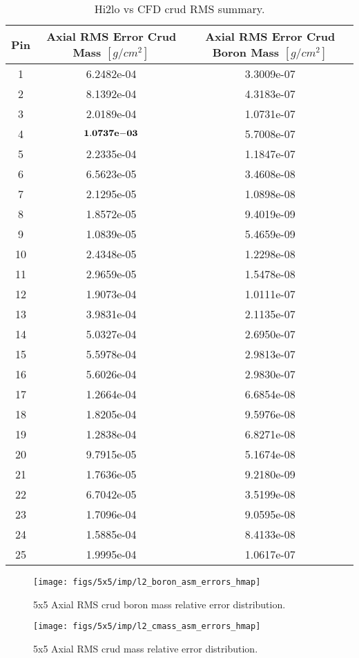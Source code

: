 \begin{table}[h]
    \begin{center}
        \caption[Hi2lo crud RMS summary.]{Hi2lo vs CFD crud RMS summary.}
    \begin{tabular}[h]{|c|C|C|}
        \hline
        Pin  & Axial RMS Error Crud Mass $[g/cm^2]$ & Axial RMS Error Crud Boron Mass $[g/cm^2]$ \\
\hline {}  & 6.2482e-04 &  3.3009e-07  \\
2  & 8.1392e-04 &  4.3183e-07  \\
3  & 2.0189e-04 &  1.0731e-07  \\
4  & $\mathbf{1.0737\mathrm{\bf e-}03}$ &  5.7008e-07  \\
5  & 2.2335e-04 &  1.1847e-07  \\
6  & 6.5623e-05 &  3.4608e-08  \\
7  & 2.1295e-05 &  1.0898e-08  \\
8  & 1.8572e-05 &  9.4019e-09  \\
9  & 1.0839e-05 &  5.4659e-09  \\
10 & 2.4348e-05 &  1.2298e-08  \\
11 & 2.9659e-05 &  1.5478e-08  \\
12 & 1.9073e-04 &  1.0111e-07  \\
13 & 3.9831e-04 &  2.1135e-07  \\
14 & 5.0327e-04 &  2.6950e-07  \\
15 & 5.5978e-04 &  2.9813e-07  \\
16 & 5.6026e-04 &  2.9830e-07  \\
17 & 1.2664e-04 &  6.6854e-08  \\
18 & 1.8205e-04 &  9.5976e-08  \\
19 & 1.2838e-04 &  6.8271e-08  \\
20 & 9.7915e-05 &  5.1674e-08  \\
21 & 1.7636e-05 &  9.2180e-09  \\
22 & 6.7042e-05 &  3.5199e-08  \\
23 & 1.7096e-04 &  9.0595e-08  \\
24 & 1.5885e-04 &  8.4133e-08  \\
25 & 1.9995e-04 &  1.0617e-07  \\
\hline
\end{tabular}
\label{tab:loo_rms}
\end{center}
\end{table}

\begin{figure}[H]
    \centering
    \texttt{[image: figs/5x5/imp/l2\_boron\_asm\_errors\_hmap]}
    \caption{5x5 Axial RMS crud boron mass relative error distribution.}
    \label{fig:l2boronasmerrorshmap}
\end{figure}
\begin{figure}[H]
    \centering
    \texttt{[image: figs/5x5/imp/l2\_cmass\_asm\_errors\_hmap]}
    \caption{5x5 Axial RMS crud mass relative error distribution.}
    \label{fig:l2cmassasmerrorshmap}
\end{figure}


